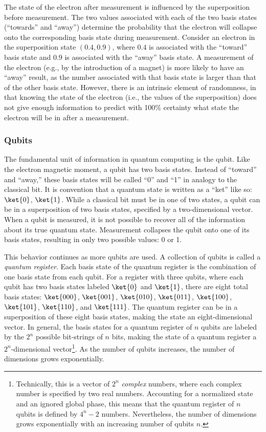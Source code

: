 \documentclass[%
 reprint,
nofootinbib,
 amsmath,amssymb,
 aps,
]{revtex4-2}
\begin{document}
The state of the electron after measurement is influenced by the superposition before measurement. The two values associated with each of the two basis states (``towards'' and ``away'') determine the probability that the electron will collapse onto the corresponding basis state during measurement. 
Consider an electron in the superposition state $(0.4, 0.9)$, where $0.4$ is associated with the ``toward'' basis state and $0.9$ is associated with the ``away'' basis state. A measurement of the electron (e.g., by the introduction of a magnet) is more likely to have an ``away'' result, as the number associated with that basis state is larger than that of the other basis state.
However, there is an intrinsic element of randomness, in that knowing the state of the electron (i.e., the values of the superposition) does not give enough information to predict with 100\% certainty what state the electron will be in after a measurement.
    

\subsubsection{Qubits}

The fundamental unit of information in quantum computing is the qubit. Like the electron magnetic moment, a qubit has two basis states. Instead of ``toward'' and ``away,'' these basis states will be called ``0'' and ``1'' in analogy to the classical bit. It is convention that a quantum state is written as a ``ket'' like so: $\ket{0}$, $\ket{1}$. While a classical bit must be in one of two states, a qubit can be in a superposition of two basis states, specified by a two-dimensional vector.
When a qubit is measured, it is not possible to recover all of the information about its true quantum state. Measurement collapses the qubit onto one of its basis states, resulting in only two possible values: 0 or 1.

This behavior continues as more qubits are used. A collection of qubits is called a \textit{quantum register}. Each basis state of the quantum register is the combination of one basis state from each qubit. For a register with three qubits, where each qubit has two basis states labeled $\ket{0}$ and $\ket{1}$, there are eight total basis states: $\ket{000}$, $\ket{001}$, $\ket{010}$, $\ket{011}$, $\ket{100}$, $\ket{101}$, $\ket{110}$, and $\ket{111}$. The quantum register can be in a superposition of these eight basis states, making the state an eight-dimensional vector. 
In general, the basis states for a quantum register of $n$ qubits are labeled by the $2^n$ possible bit-strings of $n$ bits, making the state of a quantum register a $2^n$-dimensional vector\footnote{Technically, this is a vector of $2^n$ \textit{complex} numbers, where each complex number is specified by two real numbers. Accounting for a normalized state and an ignored global phase, this means that the quantum register of $n$ qubits is defined by $4^n - 2$ numbers. Nevertheless, the number of dimensions grows exponentially with an increasing number of qubits $n$.}. As the number of qubits increases, the number of dimensions grows exponentially.
\end{document}
